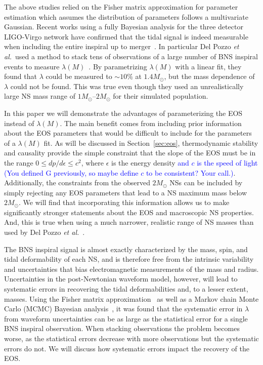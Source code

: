 \documentclass[twocolumn,prd,amssymb,aps,nofootinbib,showpacs,epsf]{revtex4}
\newcommand\les[2]{\textcolor{blue}{{#1}\sout{#2}}}
\begin{document}
The above studies relied on the Fisher matrix approximation for parameter estimation which assumes the distribution of parameters follows a multivariate Gaussian. Recent works using a fully Bayesian analysis for the three detector LIGO-Virgo network have confirmed that the tidal signal is indeed measurable when including the entire inspiral up to merger~\cite{DelPozzoLiAgathos2013, WadeCreightonOchsner2014}. In particular Del Pozzo {\it et al.}\ used a method to stack tens of observations of a large number of BNS inspiral events to measure $\lambda(M)$~\cite{DelPozzoLiAgathos2013}. By parametrizing $\lambda(M)$ with a linear fit, they found that $\lambda$ could be measured to $\sim 10\%$ at $1.4M_\odot$, but the mass dependence of $\lambda$ could not be found. This was true even though they used an unrealistically large NS mass range of $1M_\odot$--$2M_\odot$ for their simulated population.

In this paper we will demonstrate the advantages of parameterizing the EOS instead of $\lambda(M)$. The main benefit comes from including prior information about the EOS parameters that would be difficult to include for the parameters of a $\lambda(M)$ fit. As will be discussed in Section~\ref{sec:eos}, thermodynamic stability and causality provide the simple constraint that the slope of the EOS must be in the range $0 \le dp/d\epsilon \le c^2$, where $\epsilon$ is the energy density \les{and $c$ is the speed of light (You defined G previously, so maybe define $c$ to be consistent? Your call.)}{}. Additionally, the constraints from the observed $2M_\odot$ NSs can be included by simply rejecting any EOS parameters that lead to a NS maximum mass below $2M_\odot$. We will find that incorporating this information allows us to make significantly stronger statements about the EOS and macroscopic NS properties. And, this is true when using a much narrower, realistic range of NS masses than used by Del Pozzo {\it et al.}~\cite{DelPozzoLiAgathos2013}.

The BNS inspiral signal is almost exactly characterized by the mass, spin, and tidal deformability of each NS, and is therefore free from the intrinsic variability and uncertainties that bias electromagnetic measurements of the mass and radius. Uncertainties in the post-Newtonian waveform model, however, will lead to systematic errors in recovering the tidal deformabilities and, to a lesser extent, masses. Using the Fisher matrix approximation~\cite{Favata2014, YagiYunes2014} as well as a Markov chain Monte Carlo (MCMC) Bayesian analysis~\cite{WadeCreightonOchsner2014}, it was found that the systematic error in $\lambda$ from waveform uncertainties can be as large as the statistical error for a single BNS inspiral observation. When stacking observations the problem becomes worse, as the statistical errors decrease with more observations but the systematic errors do not. We will discuss how systematic errors impact the recovery of the EOS.
\end{document}
